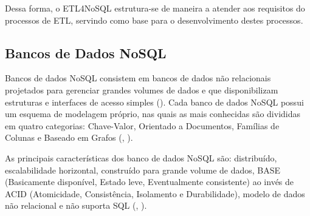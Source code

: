 \begin{itemize}
	
\end{itemize}

Dessa forma, o ETL4NoSQL estrutura-se de maneira a atender aos requisitos do processos de ETL, servindo como base para o desenvolvimento destes processos.


\subsection{Bancos de Dados NoSQL}

Bancos de dados NoSQL consistem em bancos de dados não relacionais projetados para gerenciar grandes volumes de dados e que disponibilizam estruturas e interfaces de acesso simples (\cite{lima:2015}). Cada banco de dados NoSQL possui um esquema de modelagem próprio, nas quais as mais conhecidas são divididas  em quatro categorias: Chave-Valor, Orientado a Documentos, Famílias de Colunas e Baseado em Grafos (\cite{fowler:2013}, \cite{kaur:2013}).

As principais características dos banco de dados NoSQL são: distribuído, escalabilidade horizontal, construído para grande volume de dados, BASE (Basicamente disponível, Estado leve, Eventualmente consistente) ao invés de ACID (Atomicidade, Consistência, Isolamento e Durabilidade), modelo de dados não relacional e não suporta SQL (\cite{fowler:2013}, \cite{nasholm:2012}).

